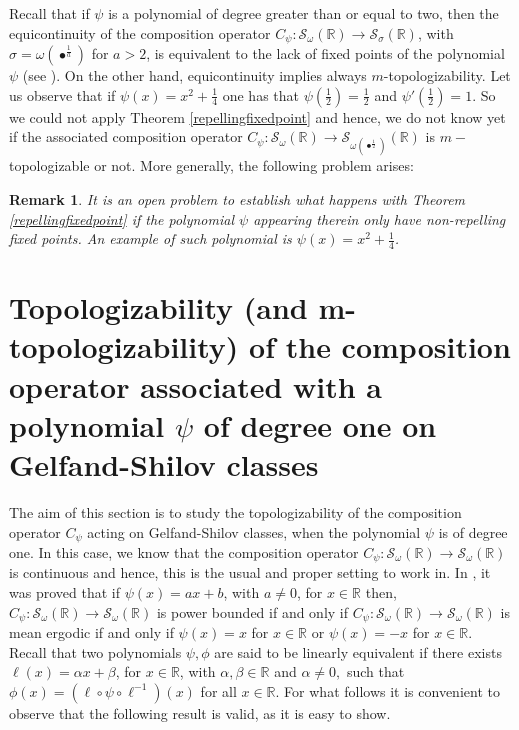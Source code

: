 \documentclass[12pt,reqno]{amsart} %
\newtheorem{remark}[theorem]{Remark}
\numberwithin{equation}{section}
\begin{document}
Recall that if $\psi$ is a polynomial of degree greater than or equal to two, then the equicontinuity of the composition operator $C_\psi:\mathcal{S}_{\omega}(\mathbb{R})\to \mathcal{S}_{\sigma}(\mathbb{R})$, with $\sigma=\omega(\bullet^{\frac{1}{a}})$ for $a>2$, is equivalent to the lack of fixed points of the polynomial $\psi$ (see \cite{RACSAM}). On the other hand, equicontinuity implies always $m$-topologizability. Let us observe that if $\psi(x)=x^2+\frac{1}{4}$ one has that $\psi(\frac{1}{2})=\frac{1}{2}$ and $\psi'(\frac{1}{2})=1$. So we could not apply Theorem \ref{repellingfixedpoint} and hence, we do not know yet if the associated composition operator $C_\psi:\mathcal{S}_{\omega}(\mathbb{R})\to \mathcal{S}_{\omega(\bullet^{\frac{1}{2}})}(\mathbb{R})$ is $m-$topologizable or not. More generally, the following problem arises: 

\begin{remark}\rm It is an open problem to establish
what happens with Theorem \ref{repellingfixedpoint} if the polynomial $\psi$ appearing therein only have non-repelling fixed points. An example of such polynomial is $\psi(x)=x^2+\frac{1}{4}$.  
\end{remark}

\section{Topologizability (and m-topologizability) of the composition operator associated with a polynomial $\psi$ of degree one on Gelfand-Shilov classes}\label{sec3}

The aim of this section is to study the topologizability of the composition operator $C_\psi$ acting on Gelfand-Shilov classes, when the polynomial $\psi$ is of degree one. In this case, we know that the composition operator $C_\psi: \mathcal{S}_{\omega}(\mathbb{R})\to \mathcal{S}_{\omega}(\mathbb{R})$ is continuous and hence, this is the usual and proper setting to work in. In \cite[Proposition 3.1]{RACSAM}, it was proved that if $\psi(x)=ax+b$, with $a\not=0$, for $x\in\mathbb{R}$ then, $C_\psi: \mathcal{S}_{\omega}(\mathbb{R})\to \mathcal{S}_{\omega}(\mathbb{R})$ is power bounded if and only if $C_\psi: \mathcal{S}_{\omega}(\mathbb{R})\to \mathcal{S}_{\omega}(\mathbb{R})$ is mean ergodic if and only if $\psi(x)=x$ for $x\in\mathbb{R}$ or $\psi(x)=-x$ for $x\in\mathbb{R}$. \\

Recall that two polynomials $\psi, \phi$ are said to be linearly equivalent if there exists $\ell(x)=\alpha x+\beta$, for $x\in\mathbb{R}$, with $\alpha, \beta\in\mathbb{R}$ and $\alpha\not = 0,$ such that $\phi(x)=(\ell \circ \psi\circ\ell^{-1})(x)$ for all $x\in\mathbb{R}$. For what follows it is convenient to observe  that the following result is valid, as it is easy to  show.
\end{document}
